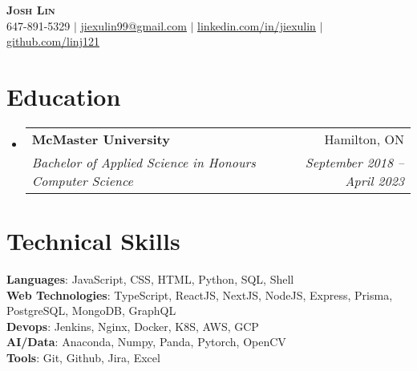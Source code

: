 \documentclass[letterpaper,11pt]{article}
\makeatletter
\newcommand{\resumeSubheading}[4]{
  \vspace{-2pt}\item
    \begin{tabular*}{0.97\textwidth}[t]{l@{\extracolsep{\fill}}r}
      \textbf{#1} & #2 \\
      \textit{\small#3} & \textit{\small #4} \\
    \end{tabular*}\vspace{-7pt}
}
\newcommand{\resumeSubHeadingListStart}{\begin{itemize}[leftmargin=0.15in, label={}]}
\newcommand{\resumeSubHeadingListEnd}{\end{itemize}}
\makeatother
\begin{document}

\begin{center}
    \textbf{\Huge \scshape Josh Lin} \\ \vspace{1pt}
    \small 647-891-5329 $|$ \href{mailto:jiexulin99@gmail.com}{\underline{jiexulin99@gmail.com}} $|$ 
    \href{https://linkedin.com/in/jiexulin}{\underline{linkedin.com/in/jiexulin}} $|$
    \href{https://github.com/linj121}{\underline{github.com/linj121}}
\end{center}


\section{Education}
  \resumeSubHeadingListStart
    \resumeSubheading
      {McMaster University}{Hamilton, ON}
      {Bachelor of Applied Science in Honours Computer Science}{September 2018 -- April 2023}
  \resumeSubHeadingListEnd

%
\section{Technical Skills}
 \begin{itemize}[leftmargin=0.15in, label={}]
    \small{\item{
     \textbf{Languages}{: JavaScript, CSS, HTML, Python, SQL, Shell} \\
     \textbf{Web Technologies}{: TypeScript, ReactJS, NextJS, NodeJS, Express, Prisma, PostgreSQL, MongoDB, GraphQL} \\
     \textbf{Devops}{: Jenkins, Nginx, Docker, K8S, AWS, GCP} \\
     \textbf{AI/Data}{: Anaconda, Numpy, Panda, Pytorch, OpenCV} \\
     \textbf{Tools}{: Git, Github, Jira, Excel} \\
    }}
 \end{itemize}
\end{document}
